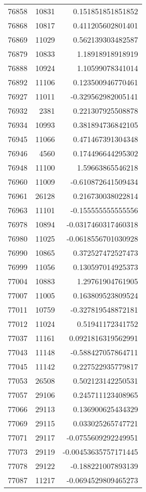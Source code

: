 \begin{tabular}{r | r | r}
76858 & 10831 & 0.151851851851852 \\
76868 & 10817 & 0.411205602801401 \\
76869 & 11029 & 0.562139303482587 \\
76879 & 10833 & 1.18918918918919 \\
76888 & 10924 & 1.10599078341014 \\
76892 & 11106 & 0.123500946770461 \\
76927 & 11011 & -0.329562982005141 \\
76932 & 2381 & 0.221307925508878 \\
76934 & 10993 & 0.381894736842105 \\
76945 & 11066 & 0.471467391304348 \\
76946 & 4560 & 0.174496644295302 \\
76948 & 11100 & 1.59663865546218 \\
76960 & 11009 & -0.610872641509434 \\
76961 & 26128 & 0.216730038022814 \\
76963 & 11101 & -0.155555555555556 \\
76978 & 10894 & -0.0317460317460318 \\
76980 & 11025 & -0.0618556701030928 \\
76990 & 10865 & 0.372527472527473 \\
76999 & 11056 & 0.130597014925373 \\
77004 & 10883 & 1.29761904761905 \\
77007 & 11005 & 0.163809523809524 \\
77011 & 10759 & -0.327819548872181 \\
77012 & 11024 & 0.51941172341752 \\
77037 & 11161 & 0.0921816319562991 \\
77043 & 11148 & -0.588427057864711 \\
77045 & 11142 & 0.227522935779817 \\
77053 & 26508 & 0.502123142250531 \\
77057 & 29106 & 0.245711123408965 \\
77066 & 29113 & 0.136900625434329 \\
77069 & 29115 & 0.033025265747721 \\
77071 & 29117 & -0.0755609292249951 \\
77073 & 29119 & -0.00453635757171445 \\
77078 & 29122 & -0.188221007893139 \\
77087 & 11217 & -0.0694529809465273 \\

\end{tabular}
